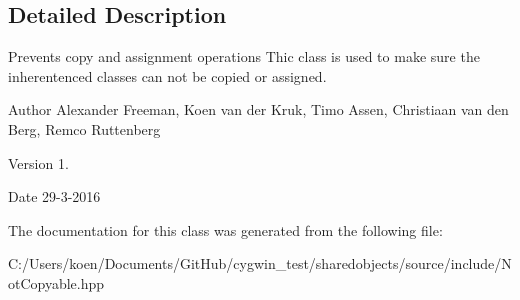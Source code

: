 \subsection{Detailed Description}
Prevents copy and assignment operations Thic class is used to make sure the inherentenced classes can not be copied or assigned. \begin{DoxyAuthor}{Author}
Alexander Freeman, Koen van der Kruk, Timo Assen, Christiaan van den Berg, Remco Ruttenberg 
\end{DoxyAuthor}
\begin{DoxyVersion}{Version}
1. 
\end{DoxyVersion}
\begin{DoxyDate}{Date}
29-\/3-\/2016 
\end{DoxyDate}


The documentation for this class was generated from the following file\+:\begin{DoxyCompactItemize}
\item 
C\+:/\+Users/koen/\+Documents/\+Git\+Hub/cygwin\+\_\+test/sharedobjects/source/include/Not\+Copyable.\+hpp\end{DoxyCompactItemize}
